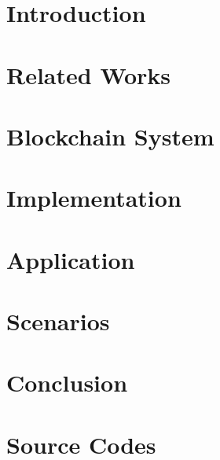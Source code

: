 \documentclass[12pt,twoside,openright]{report}
\makeatletter
\def\cleardoublepage{\clearpage\if@twoside \ifodd\c@page\else
    \hbox{}
    \thispagestyle{empty}
    \newpage
    \if@twocolumn\hbox{}\newpage\fi\fi\fi}
\makeatother
\begin{document}

\cleardoublepage


\cleardoublepage


\cleardoublepage


\cleardoublepage

\tableofcontents

\listoffigures
 
\listoftables

\listofalgorithms

\chapter{Introduction}


\chapter{Related Works}


\chapter{Blockchain System}


\chapter{Implementation}


\chapter{Application}


\chapter{Scenarios}


\chapter{Conclusion}





\appendix
\chapter{Source Codes}

\end{document}
